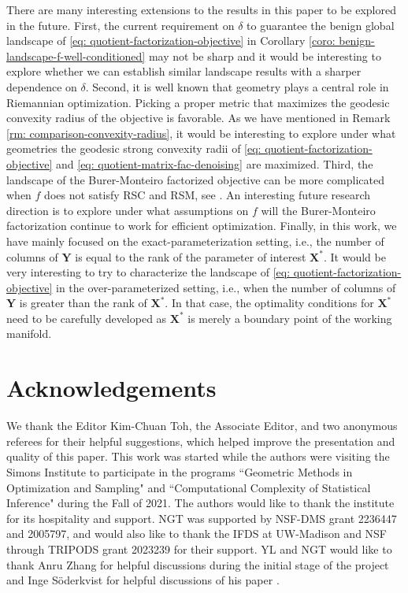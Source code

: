 \documentclass[11pt]{article}
\newcommand{\0}{{\mathbf{0}}}
\newcommand{\1}{{\mathbf{1}}}
\newcommand{\X}{{\mathbf{X}}}
\newcommand{\Y}{{\mathbf{Y}}}
\begin{document}
There are many interesting extensions to the results in this paper to be explored in the future. First, the current requirement on $\delta$ to guarantee the benign global landscape of \eqref{eq: quotient-factorization-objective} in Corollary \ref{coro: benign-landscape-f-well-conditioned} may not be sharp and it would be interesting to explore whether we can establish similar landscape results with a sharper dependence on $\delta$. Second, it is well known that geometry plays a central role in Riemannian optimization. Picking a proper metric that maximizes the geodesic convexity radius of the objective is favorable. As we have mentioned in Remark \ref{rm: comparison-convexity-radius}, it would be interesting to explore under what geometries the geodesic strong convexity radii of \eqref{eq: quotient-factorization-objective} and \eqref{eq: quotient-matrix-fac-denoising} are maximized. Third, the landscape of the Burer-Monteiro factorized objective can be more complicated when $f$ does not satisfy RSC and RSM, see \cite{yalccin2022factorization}. An interesting future research direction is to explore under what assumptions on $f$ will the Burer-Monteiro factorization continue to work for efficient optimization. Finally, in this work, we have mainly focused on the exact-parameterization setting, i.e., the number of columns of $\Y$ is equal to the rank of the parameter of interest $\X^*$. It would be very interesting to try to characterize the landscape of \eqref{eq: quotient-factorization-objective} in the over-parameterized setting, i.e., when the number of columns of $\Y$ is greater than the rank of $\X^*$. In that case, the optimality conditions for $\X^*$ need to be carefully developed as $\X^*$ is merely a boundary point of the working manifold.










\section*{Acknowledgements}
We thank the Editor Kim-Chuan Toh, the Associate Editor, and two anonymous referees for their helpful suggestions, which helped improve the presentation and quality of this paper. This work was started while the authors were visiting the Simons Institute to participate in the programs ``Geometric Methods in Optimization and Sampling" and ``Computational Complexity of Statistical Inference" during the Fall of 2021. The authors would like to thank the institute for its hospitality and support. NGT was supported by NSF-DMS grant 2236447 and 2005797, and would also like to thank the IFDS at UW-Madison and NSF through TRIPODS grant 2023239 for their support. YL and NGT would like to thank Anru Zhang for helpful discussions during the initial stage of the project and Inge S{\"o}derkvist for helpful discussions of his paper \cite{soderkvist1993perturbation}.
\end{document}
